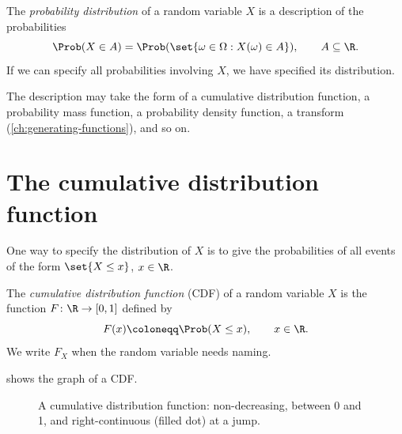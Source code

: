 \begin{definition}\label{def:distribution}
The \emph{probability distribution} of a random variable $X$ is a description of the probabilities
\[
  \Prob(X \in A) = \Prob(\set{\omega \in \Omega : X(\omega) \in A}), \qquad A \subseteq \R.
\]
If we can specify all probabilities involving $X$, we have specified its distribution.
\end{definition}

The description may take the form of a cumulative distribution function, a probability mass function, a probability density function, a transform (\cref{ch:generating-functions}), and so on.

\section{The cumulative distribution function}\label{sec:cdf}

One way to specify the distribution of $X$ is to give the probabilities of all events of the form $\set{X \le x}$, $x \in \R$.

\begin{definition}\label{def:cdf}
The \emph{cumulative distribution function} (CDF) of a random variable $X$ is the function $F \colon \R \to [0, 1]$ defined by
\[
  F(x) \coloneqq \Prob(X \le x), \qquad x \in \R.
\]
We write $F_X$ when the random variable needs naming.
\end{definition}

 shows the graph of a CDF.

\begin{figure}[ht]
\centering
{}
\caption{A cumulative distribution function: non-decreasing, between 0 and 1, and right-continuous (filled dot) at a jump.}
\label{fig:generic-cdf}
\end{figure}

